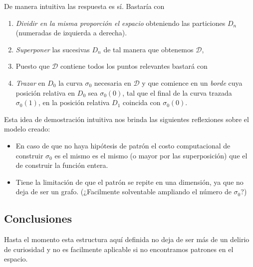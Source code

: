 De manera intuitiva las respuesta es sí. Bastaría con
\begin{enumerate}
 \item \textit{Dividir en la misma proporción el espacio} obteniendo las particiones $D_n$ (numeradas de izquierda a derecha).
 \item \textit{Superponer} las sucesivas $D_n$ de tal manera que obtenemos $\mathcal{D}$,
 \item Puesto que $\mathcal{D}$ contiene todos los puntos relevantes bastará con
 \item \textit{Trazar} en $D_0$ la curva $\sigma_0$ necesaria en  $\mathcal{D}$ y que 
  comience en un \textit{borde} cuya  posición relativa en $D_0$ sea 
  $\sigma_0(0)$, tal que el final de la curva trazada $\sigma_0(1)$, en la posición relativa 
  $D_1$  coincida con $\sigma_0(0)$. 
\end{enumerate}


Esta idea  de demostración intuitiva nos brinda las siguientes reflexiones 
sobre el modelo creado: 

\begin{itemize}
    \item En caso de que no haya hipótesis de patrón el costo computacional de construir 
    $\sigma_0$ es el mismo es el mismo (o mayor por las superposición) que el de construir la función entera. 

    \item Tiene la limitación de que el patrón se repite en una dimensión, ya que no deja de ser un grafo.
    (¿Facilmente solventable  ampliando el número de $\sigma_0$?)
\end{itemize}

\subsection{Conclusiones}

Hasta el momento esta estructura aquí definida no deja de ser más de un delirio de curiosidad 
y no es facilmente aplicable si no encontramos patrones en el espacio. 



